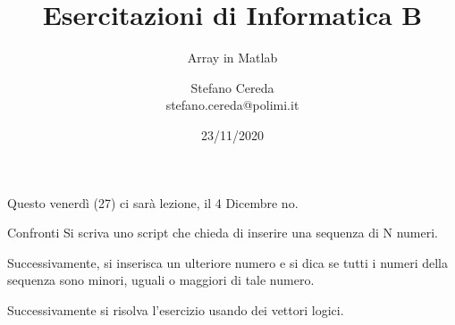 \documentclass[aspectratio=169]{beamer}
\title{Esercitazioni di Informatica B}
\subtitle{Array in Matlab}
\author{Stefano Cereda\\
	stefano.cereda@polimi.it
}
\date{23/11/2020}
\institute[PoliMi]{Politecnico Milano}
\begin{document}
\begin{frame}
	\maketitle
\end{frame}

\begin{frame}
    \Huge{\alert{Questo venerdì (27) ci sarà lezione, il 4 Dicembre no.}}
\end{frame}

%
%
%
%
%
%

\begin{frame}{Confronti}
Si scriva uno script che chieda di inserire una sequenza di N numeri.

Successivamente, si inserisca un ulteriore numero e si dica se tutti i numeri della sequenza sono minori, uguali o maggiori di tale numero.

\pause
Successivamente si risolva l'esercizio usando dei vettori logici.
\end{frame}
\end{document}
